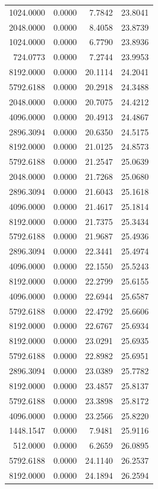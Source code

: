 \begin{tabular}{rrrr}
1024.0000 & 0.0000 & 7.7842 & 23.8041 \\
2048.0000 & 0.0000 & 8.4058 & 23.8739 \\
1024.0000 & 0.0000 & 6.7790 & 23.8936 \\
724.0773 & 0.0000 & 7.2744 & 23.9953 \\
8192.0000 & 0.0000 & 20.1114 & 24.2041 \\
5792.6188 & 0.0000 & 20.2918 & 24.3488 \\
2048.0000 & 0.0000 & 20.7075 & 24.4212 \\
4096.0000 & 0.0000 & 20.4913 & 24.4867 \\
2896.3094 & 0.0000 & 20.6350 & 24.5175 \\
8192.0000 & 0.0000 & 21.0125 & 24.8573 \\
5792.6188 & 0.0000 & 21.2547 & 25.0639 \\
2048.0000 & 0.0000 & 21.7268 & 25.0680 \\
2896.3094 & 0.0000 & 21.6043 & 25.1618 \\
4096.0000 & 0.0000 & 21.4617 & 25.1814 \\
8192.0000 & 0.0000 & 21.7375 & 25.3434 \\
5792.6188 & 0.0000 & 21.9687 & 25.4936 \\
2896.3094 & 0.0000 & 22.3441 & 25.4974 \\
4096.0000 & 0.0000 & 22.1550 & 25.5243 \\
8192.0000 & 0.0000 & 22.2799 & 25.6155 \\
4096.0000 & 0.0000 & 22.6944 & 25.6587 \\
5792.6188 & 0.0000 & 22.4792 & 25.6606 \\
8192.0000 & 0.0000 & 22.6767 & 25.6934 \\
8192.0000 & 0.0000 & 23.0291 & 25.6935 \\
5792.6188 & 0.0000 & 22.8982 & 25.6951 \\
2896.3094 & 0.0000 & 23.0389 & 25.7782 \\
8192.0000 & 0.0000 & 23.4857 & 25.8137 \\
5792.6188 & 0.0000 & 23.3898 & 25.8172 \\
4096.0000 & 0.0000 & 23.2566 & 25.8220 \\
1448.1547 & 0.0000 & 7.9481 & 25.9116 \\
512.0000 & 0.0000 & 6.2659 & 26.0895 \\
5792.6188 & 0.0000 & 24.1140 & 26.2537 \\
8192.0000 & 0.0000 & 24.1894 & 26.2594 \\

\end{tabular}
